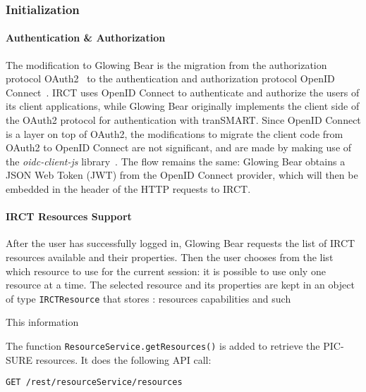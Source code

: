 \subsubsection{Initialization}

\paragraph{Authentication \& Authorization}
The modification to Glowing Bear is the migration from the authorization protocol OAuth2~\cite{oauth2} to the authentication and authorization protocol OpenID Connect~\cite{openidconnect}.
IRCT uses OpenID Connect to authenticate and authorize the users of its client applications, while Glowing Bear originally implements the client side of the OAuth2 protocol for authentication with tranSMART. 
Since OpenID Connect is a layer on top of OAuth2, the modifications to migrate the client code from OAuth2 to OpenID Connect are not significant, and are made by making use of the \emph{oidc-client-js} library~\cite{oidc-client-js}.
The flow remains the same: Glowing Bear obtains a JSON Web Token (JWT) from the OpenID Connect provider, which will then be embedded in the header of the HTTP requests to IRCT.

\paragraph{IRCT Resources Support}

After the user has successfully logged in, Glowing Bear requests the list of IRCT resources available and their properties.
Then the user chooses from the list which resource to use for the current session: it is possible to use only one resource at a time.
The selected resource and its properties are kept in an object of type \verb|IRCTResource| that stores :
resources capabilities and such

This information

The function \verb|ResourceService.getResources()| is added to retrieve the PIC-SURE resources. 
It does the following API call:
\begin{verbatim}
GET /rest/resourceService/resources
\end{verbatim}

